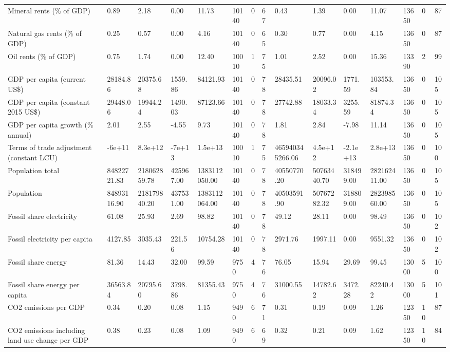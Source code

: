 \begin{longtable}{lllllllllllllll}
\addlinespace
Mineral rents (\% of GDP) & 0.89 & 2.18 & 0.00 & 11.73 & 10140 & 0 & 67 & 0.43 & 1.39 & 0.00 & 11.07 & 13650 & 0 & 87\\
Natural gas rents (\% of GDP) & 0.25 & 0.57 & 0.00 & 4.16 & 10140 & 0 & 65 & 0.30 & 0.77 & 0.00 & 4.15 & 13650 & 0 & 87\\
Oil rents (\% of GDP) & 0.75 & 1.74 & 0.00 & 12.40 & 10010 & 1 & 75 & 1.01 & 2.52 & 0.00 & 15.36 & 13390 & 2 & 99\\
GDP per capita (current US\$) & 28184.86 & 20375.68 & 1559.86 & 84121.93 & 10140 & 0 & 78 & 28435.51 & 20096.02 & 1771.59 & 103553.84 & 13650 & 0 & 105\\
GDP per capita (constant 2015 US\$) & 29448.06 & 19944.24 & 1490.03 & 87123.66 & 10140 & 0 & 78 & 27742.88 & 18033.34 & 3255.59 & 81874.34 & 13650 & 0 & 105\\
\addlinespace
GDP per capita growth (\% annual) & 2.01 & 2.55 & -4.55 & 9.73 & 10140 & 0 & 78 & 1.81 & 2.84 & -7.98 & 11.14 & 13650 & 0 & 105\\
Terms of trade adjustment (constant LCU) & -6e+11 & 8.3e+12 & -7e+13 & 1.5e+13 & 10010 & 1 & 75 & 465940345266.06 & 4.5e+12 & -2.1e+13 & 2.8e+13 & 13650 & 0 & 100\\
Population total & 84822721.83 & 218062859.78 & 425967.00 & 1383112050.00 & 10140 & 0 & 78 & 40550770.20 & 50763440.70 & 318499.00 & 282162411.00 & 13650 & 0 & 105\\
Population & 84893116.90 & 218179840.20 & 437531.00 & 1383112064.00 & 10140 & 0 & 78 & 40503591.90 & 50767282.32 & 318809.00 & 282398560.00 & 13650 & 0 & 105\\
Fossil share electricity & 61.08 & 25.93 & 2.69 & 98.82 & 10140 & 0 & 78 & 49.12 & 28.11 & 0.00 & 98.49 & 13650 & 0 & 102\\
\addlinespace
Fossil electricity per capita & 4127.85 & 3035.43 & 221.56 & 10754.28 & 10140 & 0 & 78 & 2971.76 & 1997.11 & 0.00 & 9551.32 & 13650 & 0 & 102\\
Fossil share energy & 81.36 & 14.43 & 32.00 & 99.59 & 9750 & 4 & 76 & 76.05 & 15.94 & 29.69 & 99.45 & 13000 & 5 & 100\\
Fossil share energy per capita & 36563.84 & 20795.60 & 3798.86 & 81355.43 & 9750 & 4 & 76 & 31000.55 & 14782.62 & 3472.28 & 82240.42 & 13000 & 5 & 101\\
CO2 emissions per GDP & 0.34 & 0.20 & 0.08 & 1.15 & 9490 & 6 & 71 & 0.31 & 0.19 & 0.09 & 1.26 & 12350 & 10 & 87\\
CO2 emissions including land use change per GDP & 0.38 & 0.23 & 0.08 & 1.09 & 9490 & 6 & 69 & 0.32 & 0.21 & 0.09 & 1.62 & 12350 & 10 & 84\\

\end{longtable}

